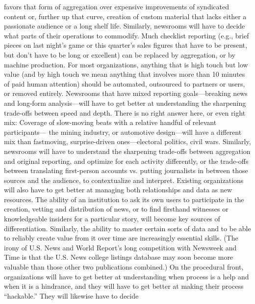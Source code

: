 favors that form of aggregation over expensive improvements of syndicated content
or, further up that curve, creation of custom material that lacks either a passionate
audience or a long shelf life.
Similarly, newsrooms will have to decide what parts of their operations to commodify.
Much checklist reporting (e.g., brief pieces on last night’s game or this
quarter’s sales figures that have to be present, but don’t have to be long or excellent)
can be replaced by aggregation, or by machine production. For most organizations,
anything that is high touch but low value (and by high touch we mean
anything that involves more than 10 minutes of paid human attention) should be
automated, outsourced to partners or users, or removed entirely.
Newsrooms that have mixed reporting goals—breaking news and long-form
analysis—will have to get better at understanding the sharpening trade-offs
between speed and depth. There is no right answer here, or even right mix:
Coverage of slow-moving beats with a relative handful of relevant participants—
the mining industry, or automotive design—will have a different mix than fastmoving,
surprise-driven ones—electoral politics, civil wars.
Similarly, newsrooms will have to understand the sharpening trade-offs between
aggregation and original reporting, and optimize for each activity differently, or
the trade-offs between translating first-person accounts vs. putting journalists in
between those sources and the audience, to contextualize and interpret.
Existing organizations will also have to get better at managing both relationships
and data as new resources. The ability of an institution to ask its own users
to participate in the creation, vetting and distribution of news, or to find firsthand
witnesses or knowledgeable insiders for a particular story, will become key
sources of differentiation. Similarly, the ability to master certain sorts of data and
to be able to reliably create value from it over time are increasingly essential skills.
(The irony of U.S. News and World Report’s long competition with Newsweek
and Time is that the U.S. News college listings database may soon become more
valuable than those other two publications combined.)
On the procedural front, organizations will have to get better at understanding
when process is a help and when it is a hindrance, and they will have to
get better at making their process ``hackable.'' They will likewise have to decide

